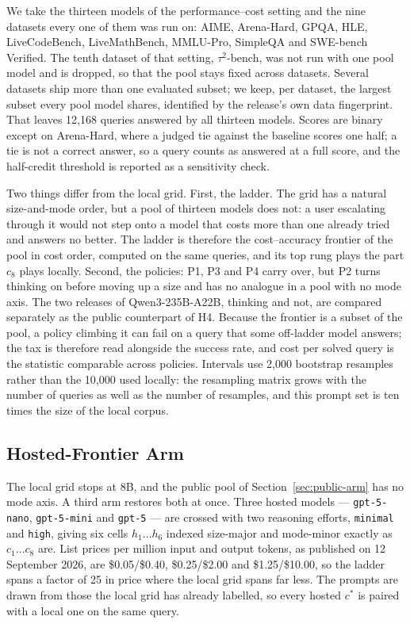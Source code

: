We take the thirteen models of the performance--cost setting and the nine
datasets every one of them was run on: AIME, Arena-Hard, GPQA, HLE,
LiveCodeBench, LiveMathBench, MMLU-Pro, SimpleQA and SWE-bench Verified.
The tenth dataset of that setting, $\tau^2$-bench, was not run with one
pool model and is dropped, so that the pool stays fixed across datasets.
Several datasets ship more than one evaluated subset; we keep, per dataset,
the largest subset every pool model shares, identified by the release's own
data fingerprint. That leaves 12{,}168 queries answered by all thirteen
models. Scores are binary except on Arena-Hard, where a judged tie against
the baseline scores one half; a tie is not a correct answer, so a query
counts as answered at a full score, and the half-credit threshold is
reported as a sensitivity check.

Two things differ from the local grid. First, the ladder. The grid has a
natural size-and-mode order, but a pool of thirteen models does not: a user
escalating through it would not step onto a model that costs more than one
already tried and answers no better. The ladder is therefore the
cost--accuracy frontier of the pool in cost order, computed on the same
queries, and its top rung plays the part $c_8$ plays locally. Second, the
policies: P1, P3 and P4 carry over, but P2 turns thinking on before moving
up a size and has no analogue in a pool with no mode axis. The two releases
of Qwen3-235B-A22B, thinking and not, are compared separately as the public
counterpart of H4. Because the frontier is a subset of the pool, a policy
climbing it can fail on a query that some off-ladder model answers; the tax
is therefore read alongside the success rate, and cost per solved query is
the statistic comparable across policies. Intervals use 2{,}000 bootstrap
resamples rather than the 10{,}000 used locally: the resampling matrix grows
with the number of queries as well as the number of resamples, and this
prompt set is ten times the size of the local corpus.

\subsection{Hosted-Frontier Arm}
\label{sec:hosted-arm}

The local grid stops at 8B, and the public pool of
Section~\ref{sec:public-arm} has no mode axis. A third arm restores both at
once. Three hosted models --- \texttt{gpt-5-nano}, \texttt{gpt-5-mini} and
\texttt{gpt-5} --- are crossed with two reasoning efforts, \texttt{minimal}
and \texttt{high}, giving six cells $h_1 \dots h_6$ indexed size-major and
mode-minor exactly as $c_1 \dots c_8$ are. List prices per million input and
output tokens, as published on 12 September 2026, are \$0.05/\$0.40,
\$0.25/\$2.00 and \$1.25/\$10.00, so the ladder spans a factor of 25 in
price where the local grid spans far less.
The prompts are drawn from those the local grid has already labelled, so
every hosted $c^*$ is paired with a local one on the same query.

